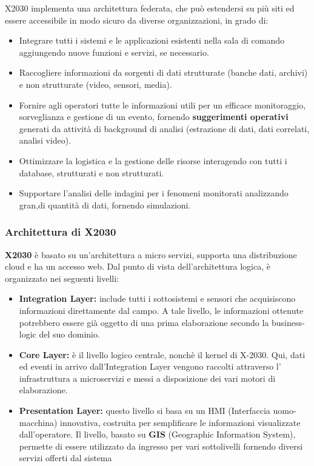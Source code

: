 X2030 implementa una architettura federata, che può estendersi su più siti ed essere
accessibile in modo sicuro da diverse organizzazioni, in grado di:
\begin{itemize}

    \item Integrare tutti i sistemi e le applicazioni esistenti nella sala di comando
     aggiungendo nuove funzioni e servizi, se necessario.
    \item Raccogliere informazioni da sorgenti di dati strutturate (banche dati,
    archivi) e non strutturate (video, sensori, media).
    \item Fornire agli operatori tutte le informazioni utili
     per un efficace monitoraggio, sorveglianza e gestione di un evento,
    fornendo \textbf{suggerimenti operativi} generati da
    attività di background di analisi (estrazione di dati, dati
    correlati, analisi video).
    \item Ottimizzare la logistica e la gestione delle risorse interagendo con
    tutti i database, strutturati e non strutturati.
    \item Supportare l'analisi delle indagini per i 
    fenomeni monitorati analizzando gran,di quantità di dati,
    fornendo simulazioni.

\end{itemize}


\subsubsection{Architettura di X2030}
\textbf{X2030} è basato su un'architettura a micro servizi,
supporta una distribuzione cloud e ha un accesso web.
Dal punto di vista dell'architettura logica,
è organizzato nei seguenti livelli:
\begin{itemize}
    \item \textbf{Integration Layer:} include tutti i sottosistemi e
    sensori che acquisiscono informazioni direttamente dal 
    campo. A tale livello, le informazioni ottenute
    potrebbero essere già oggetto di una prima elaborazione
    secondo la business-logic del suo dominio.
    \item \textbf{Core Layer:} è il livello logico centrale, nonchè il
    kernel di X-2030. Qui, dati ed eventi in arrivo
    dall'Integration Layer vengono raccolti attraverso l'
    infrastruttura a microservizi e messi
    a disposizione dei vari motori di elaborazione.
    \item \textbf{Presentation Layer:} questo livello si basa su
    un HMI (Interfaccia uomo-macchina) innovativa, costruita per semplificare le
    informazioni visualizzate dall'operatore. Il livello, basato su 
    \textbf{GIS} (Geographic Information System),
    permette di essere utilizzato da ingresso per vari sottolivelli fornendo
    diversi servizi offerti dal sistema
\end{itemize}



